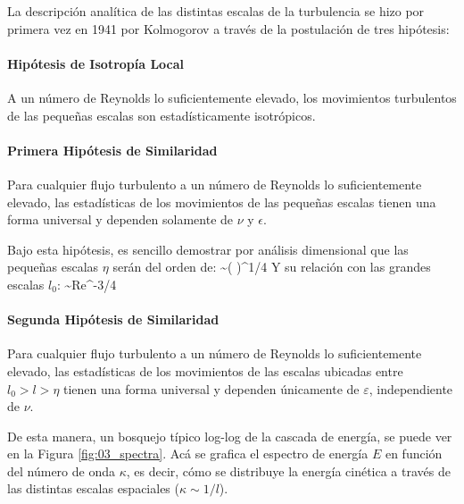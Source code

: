 La descripción analítica de las distintas escalas de la turbulencia se hizo por primera vez en 1941 por Kolmogorov a través de la postulación de tres hipótesis:
\paragraph{Hipótesis de Isotropía Local} A un número de Reynolds lo suficientemente elevado, los movimientos turbulentos de las pequeñas escalas son estadísticamente isotrópicos.
\paragraph{Primera Hipótesis de Similaridad} Para cualquier flujo turbulento a un número de Reynolds lo suficientemente elevado, las estadísticas de los movimientos de las pequeñas escalas tienen una forma universal y dependen solamente de $\nu$ y $\epsilon$.

Bajo esta hipótesis, es sencillo demostrar  por análisis dimensional que las pequeñas escalas $\eta$ serán del orden de:
\be \eta \sim \left( \right)^{1/4} \ee
Y su relación con las grandes escalas $l_0$:
\be {}\sim Re^{-3/4} \ee
\paragraph{Segunda Hipótesis de Similaridad} Para cualquier flujo turbulento a un número de Reynolds lo suficientemente elevado, las estadísticas de los movimientos de las escalas ubicadas entre $l_0>l>\eta$ tienen una forma universal y dependen únicamente de $\varepsilon$, independiente de $\nu$.

De esta manera, un bosquejo típico log-log de la cascada de energía, se puede ver en la Figura \ref{fig:03_spectra}. Acá se grafica el espectro de energía $E$ en función del número de onda $\kappa$, es decir, cómo se distribuye la energía cinética a través de las distintas escalas espaciales ($\kappa\sim 1/l$).


